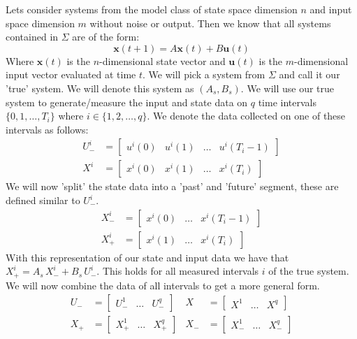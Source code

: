 Lets consider systems from the model class of state space dimension $n$ and input space dimension $m$ without noise or output. Then we know that all systems contained in $\Sigma$ are of the form:
\begin{equation}
	\label{isSystem}
	\mathbf{x}(t+1) = A \mathbf{x}(t) + B \mathbf{u}(t)
\end{equation}
Where $\mathbf{x}(t)$ is the $n$-dimensional state vector and $\mathbf{u}(t)$ is the $m$-dimensional input vector evaluated at time $t$. We will pick a system from $\Sigma$ and call it our 'true' system. We will denote this system as $(A_s , B_s)$. 
We will use our true system to generate/measure the input and state data on $q$ time intervals $\{0,1,\dots,T_i\}$ where $i \in \{1,2,\dots,q\}$. We denote the data collected on one of these intervals as follows:
\begin{align*}
	U^{i}_{-} &= \left[ \begin{array}{cccc} u^{i}(0) & u^{i}(1) & \dots & u^{i}(T_i - 1) \end{array} \right] \\
	X^{i}     &= \left[ \begin{array}{cccc} x^{i}(0) & x^{i}(1) & \dots & x^{i}(T_i) \end{array} \right]
\end{align*}
We will now 'split' the state data into a 'past' and 'future' segment, these are defined similar to $U^i_-$.
\begin{align*}
	X^{i}_{-} &= \left[ \begin{array}{ccc} x^{i}(0) & \dots & x^{i}(T_i - 1) \end{array} \right] \\
	X^{i}_{+} &= \left[ \begin{array}{ccc} x^{i}(1) & \dots & x^{i}(T_i) \end{array} \right]
\end{align*}
With this representation of our state and input data we have that $X^{i}_{+} = A_s \, X^{i}_{-} + B_s \, U^{i}_{-}$. This holds for all measured intervals $i$ of the true system. We will now combine the data of all intervals to get a more general form.
\begin{align*}
	U_{-} &= \left[ \begin{array}{ccc} U^{1}_{-} & \dots & U^{q}_{-} \end{array} \right] &
	X     &= \left[ \begin{array}{ccc} X^{1} & \dots & X^{q} \end{array} \right] \\
	X_{+} &= \left[ \begin{array}{ccc} X^{1}_{+} & \dots & X^{q}_{+} \end{array} \right] &
	X_{-} &= \left[ \begin{array}{ccc} X^{1}_{-} & \dots & X^{q}_{-} \end{array} \right]
\end{align*}
